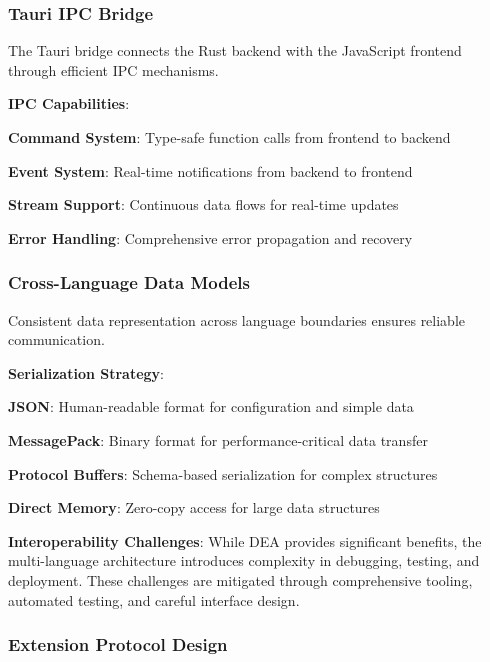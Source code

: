 \subsubsection*{Tauri IPC Bridge}

The Tauri bridge connects the Rust backend with the JavaScript frontend through efficient IPC mechanisms.

\textbf{IPC Capabilities}:
\begin{compactlist}
    \item \textbf{Command System}: Type-safe function calls from frontend to backend
    \item \textbf{Event System}: Real-time notifications from backend to frontend
    \item \textbf{Stream Support}: Continuous data flows for real-time updates
    \item \textbf{Error Handling}: Comprehensive error propagation and recovery
\end{compactlist}

\subsubsection*{Cross-Language Data Models}

Consistent data representation across language boundaries ensures reliable communication.

\textbf{Serialization Strategy}:
\begin{compactlist}
    \item \textbf{JSON}: Human-readable format for configuration and simple data
    \item \textbf{MessagePack}: Binary format for performance-critical data transfer
    \item \textbf{Protocol Buffers}: Schema-based serialization for complex structures
    \item \textbf{Direct Memory}: Zero-copy access for large data structures
\end{compactlist}

\begin{alertbox}
\textbf{Interoperability Challenges}: While DEA provides significant benefits, the multi-language architecture introduces complexity in debugging, testing, and deployment. These challenges are mitigated through comprehensive tooling, automated testing, and careful interface design.
\end{alertbox}

\subsubsection*{Extension Protocol Design}

